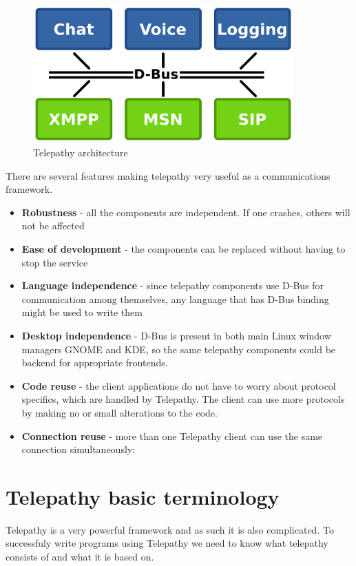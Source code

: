 \begin{figure}[ht]
\begin{center}
	\includegraphics[width=10cm]{fig/telepathy-architecture-overview.png}
	\caption{Telepathy architecture\cite{TPWiki}}
	\label{fig:telepathyArchitecture}
\end{center}
\end{figure}


There are several features making telepathy very useful as a communications framework.

\begin{itemize}

	\item {\bf Robustness} - all the components are independent. If one crashes, others will not be affected

	\item {\bf Ease of development} - the components can be replaced without having to stop the service 

	\item {\bf Language independence} - since telepathy components use D-Bus for communication among themselves, any language that has D-Bus binding might be used to write them

	\item {\bf Desktop independence} - D-Bus is present in both main Linux window managers GNOME and KDE, so the same telepathy components could be backend for appropriate frontends.

	\item {\bf Code reuse} - the client applications do not have to worry about protocol specifics, which are handled by Telepathy. The client can use more protocols by making no or small alterations to the code.

	\item {\bf Connection reuse} - more than one Telepathy client can use the same connection simultaneously:
\end{itemize}

\section{Telepathy basic terminology}
Telepathy is a very powerful framework and as such it is also complicated. To successfuly write programs using Telepathy we need to know what telepathy consists of and what it is based on. 

